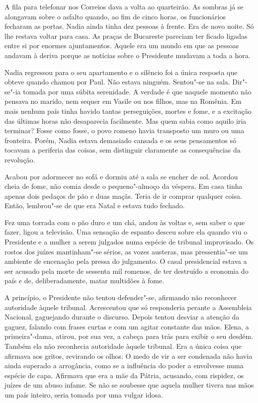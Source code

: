 \bigskip

A fila para telefonar nos Correios dava a volta ao quarteirão. As
sombras já se alongavam sobre o asfalto quando, ao fim de cinco horas,
os funcionários fecharam as portas. Nadia ainda tinha dez pessoas à
frente. Era de novo noite. Só lhe restava voltar para casa. As praças de
Bucareste pareciam ter ficado ligadas entre si por enormes ajuntamentos. Aquele era um mundo em que as pessoas andavam à deriva porque as
notícias sobre o Presidente mudavam a toda a hora.

Nadia regressou para o seu apartamento e o silêncio foi a única resposta
que obteve quando chamou por Paul. Não estava ninguém. Sentou"-se na
sala. Dir"-se"-ia tomada por uma súbita serenidade. A verdade é que
naquele momento não pensava no marido, nem sequer em Vasile ou nos
filhos, mas na Romênia. Em mais nenhum país tinha havido tantas
perseguições, mortes e fome, e a excitação das últimas horas não
desaparecia facilmente. Mas quem sabia como aquilo iria terminar? Fosse
como fosse, o povo romeno havia transposto um muro ou uma fronteira.
Porém, Nadia estava demasiado cansada e os seus pensamentos só tocavam a
periferia das coisas, sem distinguir claramente as consequências da
revolução.

Acabou por adormecer no sofá e dormiu até a sala se
encher de sol. Acordou cheia de fome, não comia desde o pequeno"-almoço
da véspera. Em casa tinha apenas dois
pedaços de pão e duas maçãs. Teria de ir comprar qualquer coisa. Então,
lembrou"-se de que era Natal e estava tudo fechado.

Fez uma torrada com o pão duro e um chá, andou às voltas e, sem saber o
que fazer, ligou a televisão. Uma sensação de espanto desceu sobre ela
quando viu o Presidente e a mulher a serem julgados numa espécie de
tribunal improvisado. Os rostos dos juízes mantinham"-se sérios, as
vozes austeras, mas pressentia"-se um ambiente de encenação pela pressa
do julgamento. O casal presidencial estava a ser acusado pela morte de
sessenta mil romenos, de ter destruído a economia do país e de,
deliberadamente, matar multidões à fome.
	
A princípio, o Presidente não tentou defender"-se, afirmando não
reconhecer autoridade àquele tribunal. Acrescentou que só responderia
perante a Assembleia Nacional, gaguejando durante o discurso. Depois
tentou desviar a atenção da gaguez, falando com frases curtas e com um
agitar constante das mãos. Elena, a primeira"-dama, atirou, por sua vez,
a cabeça para trás para exibir o seu desdém. Também ela não reconhecia
autoridade àquele tribunal. Era a única coisa que afirmava aos gritos,
revirando os olhos. O medo de vir a ser condenada não havia ainda
superado a arrogância, como se a influência do poder a envolvesse numa
espécie de capa. Afirmava que era a mãe da Pátria, acusando, com
rispidez, os juízes de um abuso infame. Se não se soubesse que aquela
mulher tivera nas mãos um país inteiro, seria tomada por uma vulgar
idosa.

